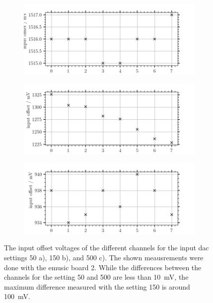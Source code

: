 \begin{figure}
	\centering
	\begin{subfigure}[b]{1.\textwidth}
		\centering
		\includegraphics[width=1.\textwidth]{pictures/input_offset_b2_dac50}
		\caption{}
		\label{fig:input_offset_b2_dac50}
	\end{subfigure}
	
	\begin{subfigure}[b]{1.\textwidth}
		\centering
		\includegraphics[width=1.\textwidth]{pictures/input_offset_b2_dac150}
		\caption{}
		\label{fig:input_offset_b2_dac150}
	\end{subfigure}

	\begin{subfigure}[b]{1.\textwidth}
		\centering
		\includegraphics[width=1.\textwidth]{pictures/input_offset_b2_dac500}
		\caption{}
		\label{fig:input_offset_b2_dac500}
	\end{subfigure}
	\caption[Input offset voltage of all channels for differen \ac{dac} settings]{The input offset voltages of the different channels for the input \ac{dac} settings 50 a), 150 b), and 500 c). The shown meausrements were done with the \ac{emusic} board 2. While the differences between the channels for the setting 50 and 500 are less than \SI{10}{\milli\volt}, the maximum difference measured with the setting 150 is around \SI{100}{\milli\volt}.}
	\label{fig:input_offset_b2_dac}
\end{figure}

